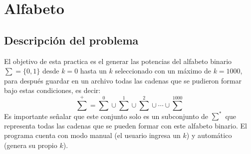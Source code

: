 	\section{Alfabeto}
	\subsection{Descripción del problema}
	El objetivo de esta practica es el generar las potencias del alfabeto binario $ \sum = \lbrace 0, 1 \rbrace $ desde $k=0$ hasta un $k$ seleccionado con un máximo de $k=1000$, para después guardar en un archivo todas las cadenas que se pudieron formar bajo estas condiciones, es decir: 
	\[{\sum}^{+} = {\sum}^{0}\cup{\sum}^{1}\cup{\sum}^{2}\cup\cdots\cup{\sum}^{1000}\]
	Es importante señalar que este conjunto solo es un subconjunto de $ {\sum}^{*} $ que representa todas las cadenas que se pueden formar con este alfabeto binario.
	El programa cuenta con modo manual (el usuario ingresa un $k$) y automático (genera su propio $k$).
